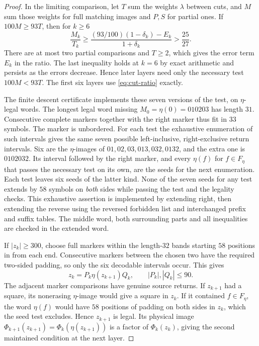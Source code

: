 \begin{proof}
In the limiting comparison, let \(T\) sum the weights \(\lambda\) between cuts, and \(M\) sum those weights for full matching images and \(P,S\) for partial ones. If \(100M\ge93T\), then for \(k\ge6\)
\[
 \frac{M_k}{T_k}\ge
 \frac{(93/100)(1-\delta_k)-E_k}{1+\delta_k}>\frac{25}{27}.
\]
There are at most two partial comparisons and \(T\ge2\), which gives the error term \(E_k\) in the ratio. The last inequality holds at \(k=6\) by exact arithmetic and persists as the errors decrease. Hence later layers need only the necessary test \(100M<93T\). The first six layers use \eqref{eq:cut-ratio} exactly.

The finite descent certificate implements these seven versions of the test, on \(\eta\)-legal words. The longest legal word missing \(M_0=\eta(0)=010203\) has length \(31\). Consecutive complete markers together with the right marker thus fit in \(33\) symbols. The marker is unbordered. For each test the exhaustive enumeration of such intervals gives the same seven possible left-inclusive, right-exclusive return intervals. Six are the \(\eta\)-images of \(01,02,03,013,032,0132\), and the extra one is \(0102032\). Its interval followed by the right marker, and every \(\eta(f)\) for \(f\in F_\eta\) that passes the necessary test on its own, are the seeds for the next enumeration. Each test leaves six seeds of the latter kind. None of the seven seeds for any test extends by \(58\) symbols on \emph{both} sides while passing the test and the legality checks. This exhaustive assertion is implemented by extending right, then extending the reverse using the reversed forbidden list and interchanged prefix and suffix tables. The middle word, both surrounding parts and all inequalities are checked in the extended word.

If \(|z_k|\ge300\), choose full markers within the length-\(32\) bands starting \(58\) positions in from each end. Consecutive markers between the chosen two have the required two-sided padding, so only the six decodable intervals occur. This gives
\[
     z_k=P_k\eta(z_{k+1})Q_k,\qquad |P_k|,|Q_k|\le90 .
\]
The adjacent marker comparisons have genuine source returns. If \(z_{k+1}\) had a square, its nonerasing \(\eta\)-image would give a square in \(z_k\). If it contained \(f\in F_\eta\), the word \(\eta(f)\) would have \(58\) positions of padding on both sides in \(z_k\), which the seed test excludes. Hence \(z_{k+1}\) is legal. Its physical image \(\Phi_{k+1}(z_{k+1})=\Phi_k(\eta(z_{k+1}))\) is a factor of \(\Phi_k(z_k)\), giving the second maintained condition at the next layer.


\end{proof}
